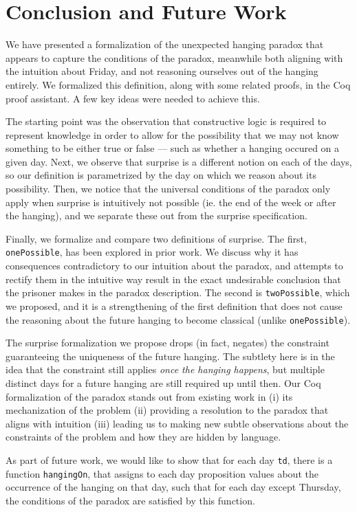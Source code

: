 \documentclass[journal]{journal}
\begin{document}
\section{Conclusion and Future Work}

We have presented a formalization of the unexpected hanging paradox that appears to capture the
conditions of the paradox, meanwhile both aligning with the
intuition about Friday, and not reasoning ourselves out of the hanging entirely.
We formalized this definition, along with some related proofs, in the Coq
proof assistant.
A few key ideas were needed to achieve this.

The starting point was the observation that constructive logic
is required to represent knowledge in order to allow for the possibility that we
may not know something to be either true or false --- such as whether a hanging
occured on a given day. Next, we observe that surprise is a different notion
on each of the days, so our definition is parametrized by the day on which
we reason about its possibility. Then, we notice that the universal conditions of the
paradox only apply when surprise is intuitively not possible (ie. the end of the
week or after the hanging), and we separate these out from the surprise specification.

Finally, we formalize and compare two definitions of surprise. The first,
{\tt onePossible}, has been explored in prior work. We discuss why it has
consequences contradictory to our intuition about the paradox, and attempts to
rectify them in the intuitive way result in the
exact undesirable conclusion that the prisoner makes in the paradox description.
The second is {\tt twoPossible}, which we proposed, and it is a strengthening of
the first definition that does not cause the reasoning about the future hanging to
become classical (unlike {\tt onePossible}).

The surprise formalization we propose drops (in fact, negates) the constraint
guaranteeing the uniqueness of the future hanging. The subtlety here is in the idea that the
constraint still applies \emph{once the hanging happens}, but multiple
distinct days for a future hanging are still required up until then.
Our Coq formalization of the paradox stands out from existing work in (i)
its mechanization of the problem (ii) providing a resolution to the paradox that aligns with
intuition (iii) leading us to making new subtle observations about the
constraints of the problem and how they are hidden by language.

As part of future work, we would like to show that for each day  {\tt td}, there
is a function {\tt hangingOn}, that assigns to each day proposition values about the
occurrence of the hanging on that day, such that
for each day except Thursday, the conditions of the paradox are satisfied by this
function.
\end{document}
